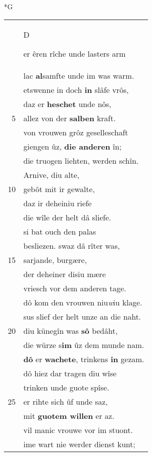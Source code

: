 \documentclass[8pt,a4paper,notitlepage]{article}
\begin{document}
\begin{table}[ht]
\begin{minipage}[t]{0.5\linewidth}
\small
\begin{center}*G
\end{center}
\begin{tabular}{rl}
 & \begin{large}D\end{large}er êren rîche unde lasters arm\\ 
 & lac \textbf{al}samfte unde im was warm.\\ 
 & etswenne in doch \textbf{in} slâfe vrôs,\\ 
 & daz er \textbf{heschet} unde nôs,\\ 
5 & allez von der \textbf{salben} kraft.\\ 
 & von vrouwen grôz geselleschaft\\ 
 & giengen ûz, \textbf{die anderen} în;\\ 
 & die truogen liehten, werden schîn.\\ 
 & Arnive, diu alte,\\ 
10 & gebôt mit ir gewalte,\\ 
 & daz ir deheiniu riefe\\ 
 & die wîle der helt dâ sliefe.\\ 
 & si bat ouch den palas\\ 
 & besliezen. swaz dâ rîter was,\\ 
15 & sarjande, burgære,\\ 
 & der deheiner disiu mære\\ 
 & vriesch vor dem anderen tage.\\ 
 & dô kom den vrouwen niu\textit{w}iu klage.\\ 
 & sus slief der helt unze an die naht.\\ 
20 & diu künegîn was \textbf{sô} bedâht,\\ 
 & die würze s\textbf{im} ûz dem munde nam.\\ 
 & \textbf{dô} er \textbf{wachete}, trinkens \textbf{in} gezam.\\ 
 & dô hiez dar tragen diu wîse\\ 
 & trinken unde guote spîse.\\ 
25 & er rihte sich ûf unde saz,\\ 
 & mit \textbf{guotem willen} er az.\\ 
 & vil manic vrouwe vor im stuont.\\ 
 & ime wart nie werder dienst kunt;\\ 

\end{tabular}
\end{minipage}
\end{table}
\end{document}
